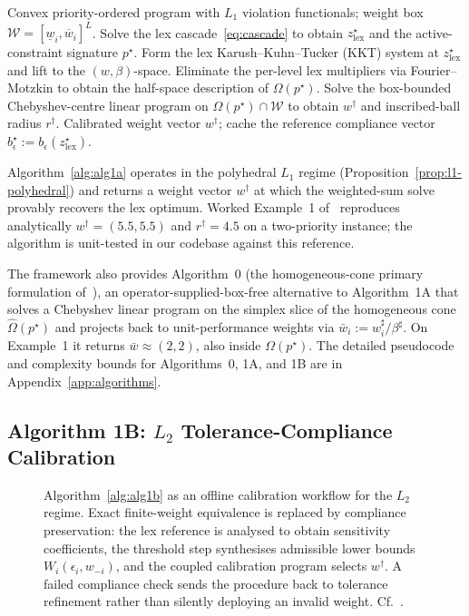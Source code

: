 \begin{algorithm}[t]
\caption{$L_1$ exact-equivalence calibration~\cite[\S9.3]{lcp2025}}
\label{alg:alg1a}
\begin{algorithmic}[1]
\Require Convex priority-ordered program with $L_1$ violation functionals; weight box $\mathcal{W} = [\underline{w}_i, \overline{w}_i]^L$.
\State Solve the lex cascade~\eqref{eq:cascade} to obtain $z_{\mathrm{lex}}^{\star}$ and the active-constraint signature $p^{\star}$.
\State Form the lex Karush--Kuhn--Tucker (KKT) system at $z_{\mathrm{lex}}^{\star}$ and lift to the $(w, \beta)$-space.
\State Eliminate the per-level lex multipliers via Fourier--Motzkin to obtain the half-space description of $\Omega(p^{\star})$.
\State Solve the box-bounded Chebyshev-centre linear program on $\Omega(p^{\star}) \cap \mathcal{W}$ to obtain $w^{\dagger}$ and inscribed-ball radius $r^{\dagger}$.
\Ensure Calibrated weight vector $w^{\dagger}$; cache the reference compliance vector $b_{\epsilon}^{\star} := b_{\epsilon}(z_{\mathrm{lex}}^{\star})$.
\end{algorithmic}
\end{algorithm}

Algorithm~\ref{alg:alg1a} operates in the polyhedral $L_1$ regime (Proposition~\ref{prop:l1-polyhedral}) and returns a weight vector $w^{\dagger}$ at which the weighted-sum solve provably recovers the lex optimum. Worked Example~1 of~\cite[\S11.1]{lcp2025} reproduces analytically $w^{\dagger} = (5.5, 5.5)$ and $r^{\dagger} = 4.5$ on a two-priority instance; the algorithm is unit-tested in our codebase against this reference.

The framework also provides Algorithm~0 (the homogeneous-cone primary formulation of~\cite[\S9.1]{lcp2025}), an operator-supplied-box-free alternative to Algorithm~1A that solves a Chebyshev linear program on the simplex slice of the homogeneous cone $\widehat\Omega(p^\star)$ and projects back to unit-performance weights via $\bar w_i := w_i^\sharp / \beta^\sharp$. On Example~1 it returns $\bar w \approx (2, 2)$, also inside $\Omega(p^\star)$. The detailed pseudocode and complexity bounds for Algorithms~0, 1A, and 1B are in Appendix~\ref{app:algorithms}.

\subsection{Algorithm 1B: $L_2$ Tolerance-Compliance Calibration}
\label{sec:foundations:alg1b}

\begin{figure}[t]
    \centering
    
    \caption{Algorithm~\ref{alg:alg1b} as an offline calibration workflow for the $L_2$ regime. Exact finite-weight equivalence is replaced by compliance preservation: the lex reference is analysed to obtain sensitivity coefficients, the threshold step synthesises admissible lower bounds $W_i(\epsilon_i, w_{-i})$, and the coupled calibration program selects $w^{\dagger}$. A failed compliance check sends the procedure back to tolerance refinement rather than silently deploying an invalid weight. Cf.~\cite[Fig.~B2]{lcp2025}.}
    \label{fig:alg1b_flow}
\end{figure}

